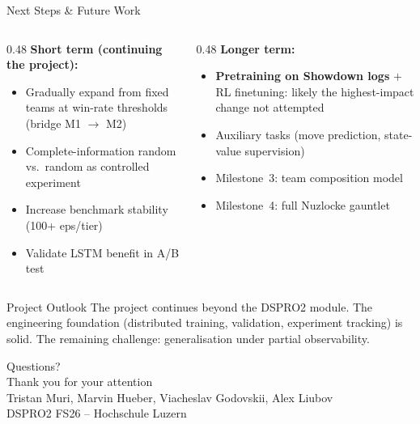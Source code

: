 \documentclass[aspectratio=169, 11pt]{beamer}
\begin{document}
\begin{frame}{Next Steps \& Future Work}
  \begin{columns}[T]
    \begin{column}{0.48\textwidth}
      \textbf{Short term (continuing the project):}
      \begin{itemize}\setlength{\itemsep}{0.2em}
        \item Gradually expand from fixed teams at win-rate thresholds
              (bridge M1 $\to$ M2)
        \item Complete-information random vs.\ random as controlled
              experiment
        \item Increase benchmark stability (100+ eps/tier)
        \item Validate LSTM benefit in A/B test
      \end{itemize}
    \end{column}

    \begin{column}{0.48\textwidth}
      \textbf{Longer term:}
      \begin{itemize}\setlength{\itemsep}{0.2em}
        \item \textbf{Pretraining on Showdown logs} $+$ RL finetuning:
              likely the highest-impact change not attempted
        \item Auxiliary tasks (move prediction, state-value supervision)
        \item Milestone~3: team composition model
        \item Milestone~4: full Nuzlocke gauntlet
      \end{itemize}
    \end{column}
  \end{columns}

  \vspace{0.6em}
  \begin{block}{Project Outlook}
    The project continues beyond the DSPRO2 module. The engineering
    foundation (distributed training, validation, experiment tracking) is
    solid. The remaining challenge: generalisation under partial
    observability.
  \end{block}
\end{frame}

\begin{frame}[plain]
  \begin{center}
    \vfill
    {\Huge\color{primaryBlue} Questions?}\\[1.5em]
    {\large Thank you for your attention}\\[1em]
    {\small Tristan Muri, Marvin Hueber, Viacheslav Godovskii, Alex Liubov}\\[0.5em]
    {\small\color{gray} DSPRO2 FS26 -- Hochschule Luzern}
    \vfill
  \end{center}
\end{frame}
\end{document}
